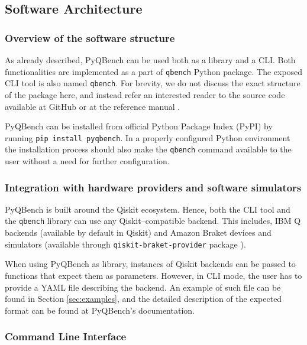 \documentclass[preprint,12pt, a4paper, dvipsnames]{elsarticle}
\newcommand{\1}{{\rm 1\hspace{-0.9mm}l}}
\theoremstyle{definition}
\begin{document}
\subsection{Software Architecture}\label{sec:sortware-architecture}

\subsubsection{Overview of the software structure}
As already described, PyQBench can be used both as a library and a CLI. Both functionalities are
implemented as a part of \texttt{qbench} Python package. The exposed CLI tool is also named
\texttt{qbench}. For brevity, we do not discuss the exact structure of the package here, and instead
refer an interested reader to the source code available at GitHub \cite{pyqbenchgithub} or at the
reference manual \cite{pyqbenchdocs}.

PyQBench can be installed from official Python Package Index (PyPI) by running \texttt{pip install
pyqbench}. In a properly configured Python environment the installation process should also make the
\texttt{qbench} command available to the user without a need for further configuration.

\subsubsection{Integration with hardware providers and software simulators}

PyQBench is built around the Qiskit \cite{qiskit} ecosystem. Hence, both the CLI tool and the
\texttt{qbench} library can use any Qiskit--compatible backend. This includes, IBM Q backends
(available by default in Qiskit) and Amazon Braket devices and simulators (available through
\texttt{qiskit-braket-provider} package \cite{qiskit-braket-provider,
qiskit-braket-provider-github}).

When using PyQBench as library, instances of Qiskit backends can be passed to functions that expect
them as parameters. However, in CLI mode, the user has to provide a YAML file describing the
backend. An example of such file can be found in Section \ref{sec:examples}, and the detailed
description of the expected format can be found at PyQBench's documentation.

\subsubsection{Command Line Interface}
\label{sec:cli}
\end{document}

